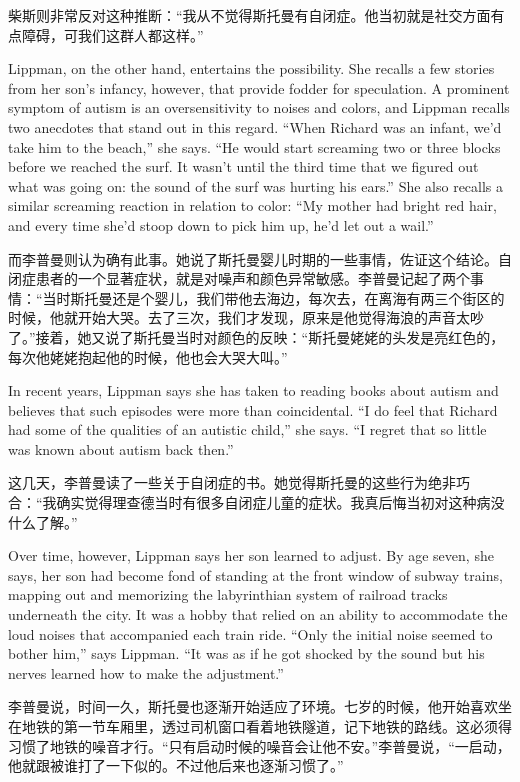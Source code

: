\ifdefined\chs
柴斯则非常反对这种推断：``我从不觉得斯托曼有自闭症。他当初就是社交方面有点障碍，可我们这群人都这样。''
\fi

\ifdefined\eng
Lippman, on the other hand, entertains the possibility. She recalls a few stories from her son's infancy, however, that provide fodder for speculation. A prominent symptom of autism is an oversensitivity to noises and colors, and Lippman recalls two anecdotes that stand out in this regard. ``When Richard was an infant, we'd take him to the beach,'' she says. ``He would start screaming two or three blocks before we reached the surf. It wasn't until the third time that we figured out what was going on: the sound of the surf was hurting his ears.'' She also recalls a similar screaming reaction in relation to color: ``My mother had bright red hair, and every time she'd stoop down to pick him up, he'd let out a wail.''
\fi

\ifdefined\chs
而李普曼则认为确有此事。她说了斯托曼婴儿时期的一些事情，佐证这个结论。自闭症患者的一个显著症状，就是对噪声和颜色异常敏感。李普曼记起了两个事情：``当时斯托曼还是个婴儿，我们带他去海边，每次去，在离海有两三个街区的时候，他就开始大哭。去了三次，我们才发现，原来是他觉得海浪的声音太吵了。''接着，她又说了斯托曼当时对颜色的反映：``斯托曼姥姥的头发是亮红色的，每次他姥姥抱起他的时候，他也会大哭大叫。''
\fi

\ifdefined\eng
In recent years, Lippman says she has taken to reading books about autism and believes that such episodes were more than coincidental. ``I do feel that Richard had some of the qualities of an autistic child,'' she says. ``I regret that so little was known about autism back then.''
\fi

\ifdefined\chs
这几天，李普曼读了一些关于自闭症的书。她觉得斯托曼的这些行为绝非巧合：``我确实觉得理查德当时有很多自闭症儿童的症状。我真后悔当初对这种病没什么了解。''
\fi

\ifdefined\eng
Over time, however, Lippman says her son learned to adjust. By age seven, she says, her son had become fond of standing at the front window of subway trains, mapping out and memorizing the labyrinthian system of railroad tracks underneath the city. It was a hobby that relied on an ability to accommodate the loud noises that accompanied each train ride. ``Only the initial noise seemed to bother him,'' says Lippman. ``It was as if he got shocked by the sound but his nerves learned how to make the adjustment.''
\fi

\ifdefined\chs
李普曼说，时间一久，斯托曼也逐渐开始适应了环境。七岁的时候，他开始喜欢坐在地铁的第一节车厢里，透过司机窗口看着地铁隧道，记下地铁的路线。这必须得习惯了地铁的噪音才行。``只有启动时候的噪音会让他不安。''李普曼说，``一启动，他就跟被谁打了一下似的。不过他后来也逐渐习惯了。''
\fi

